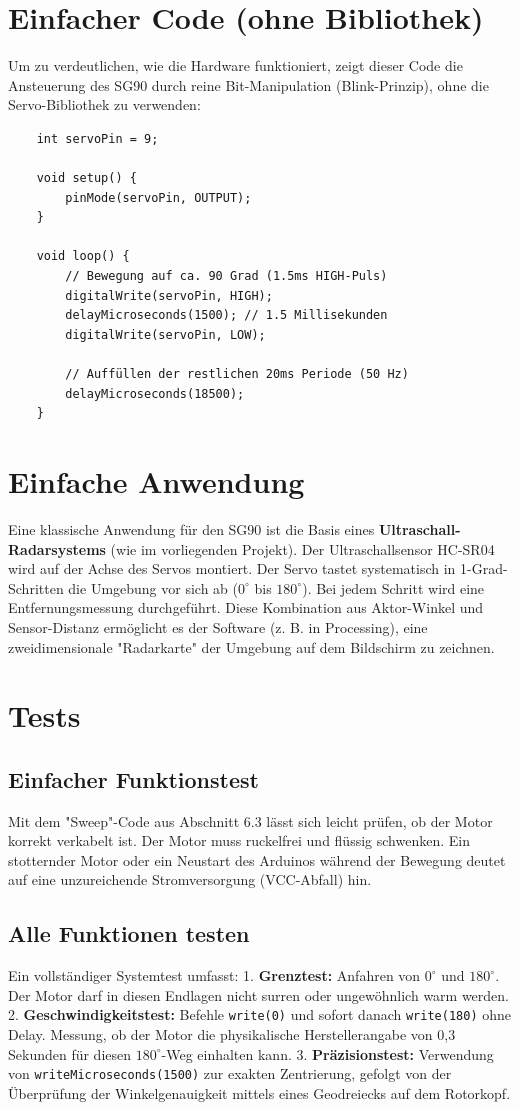\section{Einfacher Code (ohne Bibliothek)}
Um zu verdeutlichen, wie die Hardware funktioniert, zeigt dieser Code die Ansteuerung des SG90 durch reine Bit-Manipulation (Blink-Prinzip), ohne die Servo-Bibliothek zu verwenden:
\begin{verbatim}
	int servoPin = 9;
	
	void setup() {
		pinMode(servoPin, OUTPUT);
	}
	
	void loop() {
		// Bewegung auf ca. 90 Grad (1.5ms HIGH-Puls)
		digitalWrite(servoPin, HIGH);
		delayMicroseconds(1500); // 1.5 Millisekunden
		digitalWrite(servoPin, LOW);
		
		// Auffüllen der restlichen 20ms Periode (50 Hz)
		delayMicroseconds(18500); 
	}
\end{verbatim}

\section{Einfache Anwendung}
Eine klassische Anwendung für den SG90 ist die Basis eines \textbf{Ultraschall-Radarsystems} (wie im vorliegenden Projekt). Der Ultraschallsensor HC-SR04 wird auf der Achse des Servos montiert. Der Servo tastet systematisch in 1-Grad-Schritten die Umgebung vor sich ab ($0^\circ$ bis $180^\circ$). Bei jedem Schritt wird eine Entfernungsmessung durchgeführt. Diese Kombination aus Aktor-Winkel und Sensor-Distanz ermöglicht es der Software (z. B. in Processing), eine zweidimensionale "Radarkarte" der Umgebung auf dem Bildschirm zu zeichnen.

\section{Tests}

\subsection{Einfacher Funktionstest}
Mit dem "Sweep"-Code aus Abschnitt 6.3 lässt sich leicht prüfen, ob der Motor korrekt verkabelt ist. Der Motor muss ruckelfrei und flüssig schwenken. Ein stotternder Motor oder ein Neustart des Arduinos während der Bewegung deutet auf eine unzureichende Stromversorgung (VCC-Abfall) hin.

\subsection{Alle Funktionen testen}
Ein vollständiger Systemtest umfasst:
1. \textbf{Grenztest:} Anfahren von $0^\circ$ und $180^\circ$. Der Motor darf in diesen Endlagen nicht surren oder ungewöhnlich warm werden.
2. \textbf{Geschwindigkeitstest:} Befehle \texttt{write(0)} und sofort danach \texttt{write(180)} ohne Delay. Messung, ob der Motor die physikalische Herstellerangabe von 0,3 Sekunden für diesen $180^\circ$-Weg einhalten kann.
3. \textbf{Präzisionstest:} Verwendung von \texttt{writeMicroseconds(1500)} zur exakten Zentrierung, gefolgt von der Überprüfung der Winkelgenauigkeit mittels eines Geodreiecks auf dem Rotorkopf.

